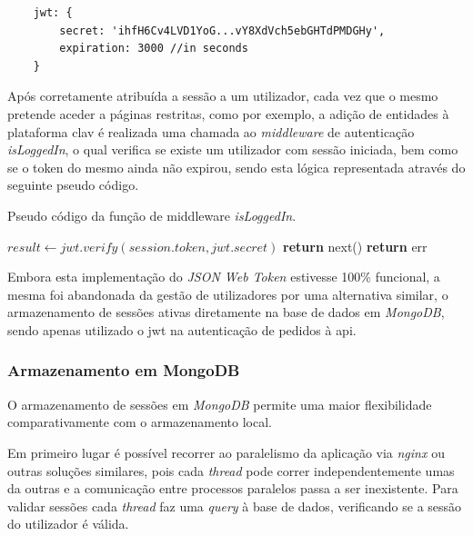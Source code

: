\begin{verbatim}
    jwt: {
        secret: 'ihfH6Cv4LVD1YoG...vY8XdVch5ebGHTdPMDGHy',
        expiration: 3000 //in seconds
    }
\end{verbatim}

Após corretamente atribuída a sessão a um utilizador, cada vez que o mesmo pretende aceder a páginas restritas, como por exemplo, a adição de entidades à plataforma \gls{clav} é realizada uma chamada ao \emph{middleware} de autenticação \emph{isLoggedIn}, o qual verifica se existe um utilizador com sessão iniciada, bem como se o token do mesmo ainda não expirou, sendo esta lógica representada através do seguinte pseudo código.

\begin{algorithm}
    \caption{Pseudo código da função  de middleware \emph{isLoggedIn}.}
    \begin{algorithmic}[1]
        \State $result \gets jwt.verify(session.token, jwt.secret)$
                \State \textbf{return} next()
            \Else
                \State \textbf{return} err
            \EndIf
        \EndIf
    \EndFunction
    \end{algorithmic}
\end{algorithm}

Embora esta implementação do \emph{JSON Web Token} estivesse 100\% funcional, a mesma foi abandonada da gestão de utilizadores por uma alternativa similar, o armazenamento de sessões ativas diretamente na base de dados em \emph{MongoDB}, sendo apenas utilizado o \gls{jwt} na autenticação de pedidos à \gls{api}.

\cleardoublepage
\subsubsection{Armazenamento em MongoDB}

O armazenamento de sessões em \emph{MongoDB} permite uma maior flexibilidade comparativamente com o armazenamento local.

Em primeiro lugar é possível recorrer ao paralelismo da aplicação via \emph{nginx} ou outras soluções similares, pois cada \emph{thread} pode correr independentemente umas da outras e a comunicação entre processos paralelos passa a ser inexistente. Para validar sessões cada \emph{thread} faz uma \emph{query} à base de dados, verificando se a sessão do utilizador é válida.

